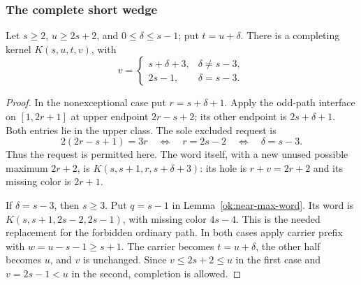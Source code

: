 \subsubsection{The complete short wedge}

\begin{lemma}\label{ok:unequal-wedge-kernel}
Let $s\ge2$, $u\ge2s+2$, and $0\le\delta\le s-1$; put
$t=u+\delta$. There is a completing kernel $K(s,u,t,v)$, with
\[
 v=\begin{cases}
 s+\delta+3,&\delta\ne s-3,\\
 2s-1,&\delta=s-3.
 \end{cases}
 \]
\end{lemma}
\begin{proof}
In the nonexceptional case put $r=s+\delta+1$.
Apply the odd-path interface on $[1,2r+1]$ at upper endpoint
$2r-s+2$; its other endpoint is $2s+\delta+1$.
Both entries lie in the upper class. The sole excluded request is
\[
 2(2r-s+1)=3r
 \quad\Longleftrightarrow\quad r=2s-2
 \quad\Longleftrightarrow\quad\delta=s-3.
 \]
Thus the request is permitted here.
The word itself, with a new unused possible maximum $2r+2$,
is $K(s,s+1,r,s+\delta+3)$:
its hole is $r+v=2r+2$ and its missing color is $2r+1$.

If $\delta=s-3$, then $s\ge3$. Put $q=s-1$ in
Lemma~\ref{ok:near-max-word}. Its word is
$K(s,s+1,2s-2,2s-1)$, with missing color $4s-4$.
This is the needed replacement for the forbidden ordinary path.
In both cases apply carrier prefix with
$w=u-s-1\ge s+1$. The carrier becomes $t=u+\delta$,
the other half becomes $u$, and $v$ is unchanged.
Since $v\le2s+2\le u$ in the first case and $v=2s-1<u$
in the second, completion is allowed.
\end{proof}

